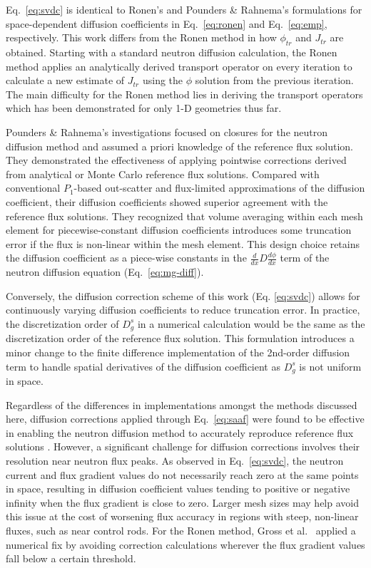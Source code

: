 Eq.\ \ref{eq:svdc} is identical to Ronen's \cite{ronen_accurate_2004} and Pounders \& Rahnema's
\cite{pounders_diffusion_2009} formulations for space-dependent diffusion coefficients in Eq.\
\ref{eq:ronen} and Eq.\ \ref{eq:emp}, respectively. This work differs from the Ronen method in how
$\phi_{tr}$ and $J_{tr}$ are obtained. Starting with
a standard neutron diffusion calculation, the Ronen method applies an analytically derived
transport operator on every iteration to calculate a new estimate of $J_{tr}$ using the $\phi$
solution from the previous iteration. The main difficulty for the Ronen method lies in deriving the
transport operators which has been demonstrated for only 1-D geometries thus far.

Pounders \& Rahnema's \cite{pounders_diffusion_2009} investigations focused on closures for the neutron diffusion method and
assumed a priori knowledge of the reference flux solution.
They demonstrated the effectiveness of applying
pointwise corrections derived from analytical or Monte Carlo reference flux solutions. Compared
with conventional $P_1$-based out-scatter and flux-limited approximations of the diffusion
coefficient, their diffusion coefficients showed superior agreement
with the reference flux solutions. They recognized that volume averaging within each mesh element
for piecewise-constant diffusion coefficients introduces some truncation error if the flux is
non-linear within the mesh element. This design choice retains the diffusion coefficient as a
piece-wise constants in the $\frac{d}{dx}D\frac{d\phi}{dx}$ term of the neutron
diffusion equation (Eq.\ \ref{eq:mg-diff}).

Conversely, the diffusion correction scheme of this work (Eq. \ref{eq:svdc}) allows for continuously
varying diffusion coefficients to reduce truncation error. In practice, the discretization order of
$D^s_g$ in a numerical calculation would be the same as the discretization order of
the reference flux solution. This formulation introduces a minor change to the finite difference
implementation of the 2nd-order diffusion term to handle spatial derivatives of the
diffusion coefficient as $D^s_g$ is not uniform in space.

Regardless of the differences in implementations amongst the methods discussed here,
diffusion corrections applied through Eq.\ \ref{eq:saaf} were
found to be effective in enabling the neutron diffusion method to accurately reproduce reference
flux solutions \cite{gross_comprehensive_2023, pounders_diffusion_2009}.
However, a significant challenge for diffusion corrections
involves their resolution near neutron flux peaks. As observed in Eq.\ \ref{eq:svdc}, the neutron
current and flux gradient values do not necessarily reach zero at the same points in space,
resulting in diffusion coefficient values tending to positive or negative infinity when the
flux gradient is close to zero. Larger mesh sizes may help avoid this issue at the cost of
worsening flux accuracy in regions with
steep, non-linear fluxes, such as near control rods. For the Ronen method, Gross et al.\
\cite{gross_comprehensive_2023} applied a numerical fix by avoiding correction
calculations wherever the flux gradient values fall below a certain threshold. 

